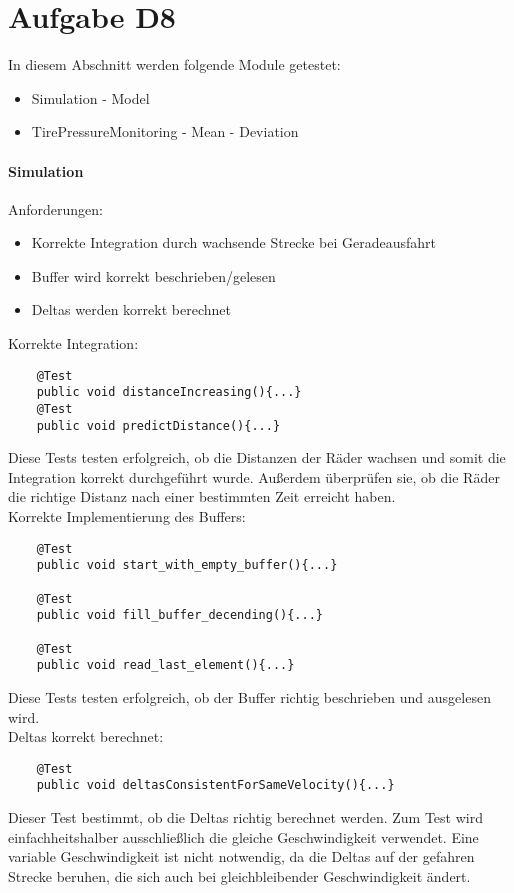 
\chapter{Aufgabe D8}
In diesem Abschnitt werden folgende Module getestet:
\begin{itemize}
	\item Simulation
			\subitem - Model
	\item TirePressureMonitoring
			\subitem - Mean 
			\subitem - Deviation
\end{itemize}
\subsubsection{Simulation}
Anforderungen:
\begin{itemize}
	\item Korrekte Integration durch wachsende Strecke bei Geradeausfahrt
	\item Buffer wird korrekt beschrieben/gelesen
	\item Deltas werden korrekt berechnet
\end{itemize}
Korrekte Integration:
\begin{lstlisting}
	@Test
	public void distanceIncreasing(){...}
	@Test
	public void predictDistance(){...}
\end{lstlisting}
Diese Tests testen erfolgreich, ob die Distanzen der Räder wachsen und somit die Integration korrekt durchgeführt wurde. Außerdem überprüfen sie, ob die Räder die richtige Distanz nach einer bestimmten Zeit erreicht haben.\\

Korrekte Implementierung des Buffers:
\begin{lstlisting}
	@Test
	public void start_with_empty_buffer(){...}
	
	@Test
	public void fill_buffer_decending(){...}
	
	@Test
	public void read_last_element(){...}
\end{lstlisting}
Diese Tests testen erfolgreich, ob der Buffer richtig beschrieben und ausgelesen wird.\\

Deltas korrekt berechnet:
\begin{lstlisting}
	@Test
	public void deltasConsistentForSameVelocity(){...}
\end{lstlisting}
Dieser Test bestimmt, ob die Deltas richtig berechnet werden. Zum Test wird einfachheitshalber ausschließlich die gleiche Geschwindigkeit verwendet. Eine variable Geschwindigkeit ist nicht notwendig, da die Deltas auf der gefahren Strecke beruhen, die sich auch bei gleichbleibender Geschwindigkeit ändert.

